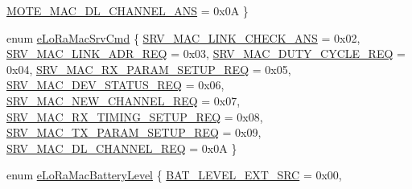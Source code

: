 \begin{DoxyCompactItemize}
\newline
\mbox{\hyperlink{group___l_o_r_a_m_a_c_ggaa56523d6cd76c438d6bc4263b5254d73a6dfc8ca9222ce73c834a0907992cce13}{M\+O\+T\+E\+\_\+\+M\+A\+C\+\_\+\+D\+L\+\_\+\+C\+H\+A\+N\+N\+E\+L\+\_\+\+A\+NS}} = 0x0A
 \}
\item 
enum \mbox{\hyperlink{group___l_o_r_a_m_a_c_gac91cc4dc69ad7de2426360f9f1f2d079}{e\+Lo\+Ra\+Mac\+Srv\+Cmd}} \{ \newline
\mbox{\hyperlink{group___l_o_r_a_m_a_c_ggac91cc4dc69ad7de2426360f9f1f2d079ac9df0550be22a470d4f68681ee97191c}{S\+R\+V\+\_\+\+M\+A\+C\+\_\+\+L\+I\+N\+K\+\_\+\+C\+H\+E\+C\+K\+\_\+\+A\+NS}} = 0x02, 
\mbox{\hyperlink{group___l_o_r_a_m_a_c_ggac91cc4dc69ad7de2426360f9f1f2d079af7fc388963e2bb713062bd51960ed4cc}{S\+R\+V\+\_\+\+M\+A\+C\+\_\+\+L\+I\+N\+K\+\_\+\+A\+D\+R\+\_\+\+R\+EQ}} = 0x03, 
\mbox{\hyperlink{group___l_o_r_a_m_a_c_ggac91cc4dc69ad7de2426360f9f1f2d079ae1175fb1d39611d84efb70f141064fbf}{S\+R\+V\+\_\+\+M\+A\+C\+\_\+\+D\+U\+T\+Y\+\_\+\+C\+Y\+C\+L\+E\+\_\+\+R\+EQ}} = 0x04, 
\mbox{\hyperlink{group___l_o_r_a_m_a_c_ggac91cc4dc69ad7de2426360f9f1f2d079a534efe0aaa23bc72032a0e8b0335832b}{S\+R\+V\+\_\+\+M\+A\+C\+\_\+\+R\+X\+\_\+\+P\+A\+R\+A\+M\+\_\+\+S\+E\+T\+U\+P\+\_\+\+R\+EQ}} = 0x05, 
\newline
\mbox{\hyperlink{group___l_o_r_a_m_a_c_ggac91cc4dc69ad7de2426360f9f1f2d079ac98ae516df5419b24285a74da2d58d7f}{S\+R\+V\+\_\+\+M\+A\+C\+\_\+\+D\+E\+V\+\_\+\+S\+T\+A\+T\+U\+S\+\_\+\+R\+EQ}} = 0x06, 
\mbox{\hyperlink{group___l_o_r_a_m_a_c_ggac91cc4dc69ad7de2426360f9f1f2d079a34e94bc23cacf1ab088ae1010e55efeb}{S\+R\+V\+\_\+\+M\+A\+C\+\_\+\+N\+E\+W\+\_\+\+C\+H\+A\+N\+N\+E\+L\+\_\+\+R\+EQ}} = 0x07, 
\mbox{\hyperlink{group___l_o_r_a_m_a_c_ggac91cc4dc69ad7de2426360f9f1f2d079aa24b1505ef48247c1d2a3d486d603686}{S\+R\+V\+\_\+\+M\+A\+C\+\_\+\+R\+X\+\_\+\+T\+I\+M\+I\+N\+G\+\_\+\+S\+E\+T\+U\+P\+\_\+\+R\+EQ}} = 0x08, 
\mbox{\hyperlink{group___l_o_r_a_m_a_c_ggac91cc4dc69ad7de2426360f9f1f2d079a6b15b371027770899224e613bbe162a8}{S\+R\+V\+\_\+\+M\+A\+C\+\_\+\+T\+X\+\_\+\+P\+A\+R\+A\+M\+\_\+\+S\+E\+T\+U\+P\+\_\+\+R\+EQ}} = 0x09, 
\newline
\mbox{\hyperlink{group___l_o_r_a_m_a_c_ggac91cc4dc69ad7de2426360f9f1f2d079ae3385a6aa575b3ac756c362dbbc8c39f}{S\+R\+V\+\_\+\+M\+A\+C\+\_\+\+D\+L\+\_\+\+C\+H\+A\+N\+N\+E\+L\+\_\+\+R\+EQ}} = 0x0A
 \}
\item 
enum \mbox{\hyperlink{group___l_o_r_a_m_a_c_gac7cbd1d9dc906cf2b33e3715cdd426c3}{e\+Lo\+Ra\+Mac\+Battery\+Level}} \{ \mbox{\hyperlink{group___l_o_r_a_m_a_c_ggac7cbd1d9dc906cf2b33e3715cdd426c3ab2585bfe30f5bf5b5eee079ed2239cf4}{B\+A\+T\+\_\+\+L\+E\+V\+E\+L\+\_\+\+E\+X\+T\+\_\+\+S\+RC}} = 0x00, 

\end{DoxyCompactItemize}
